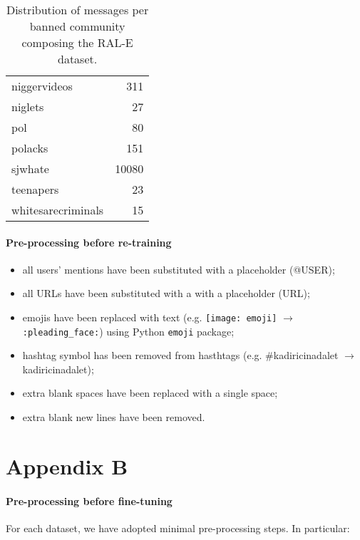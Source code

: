 \documentclass[11pt]{article}
\begin{document}
\begin{table}[!tbh]
\begin{tabular}{lr}
niggervideos        &        311 \\
niglets             &         27 \\
pol                 &         80 \\
polacks             &        151 \\
sjwhate             &      10080 \\
teenapers           &         23 \\
whitesarecriminals      &     15 \\
    \end{tabular}
    \caption{Distribution of messages per banned community composing the RAL-E dataset.}
    \label{tab:rale}
\end{table}


\paragraph{Pre-processing before re-training}

\begin{itemize}
    \item all users' mentions have been substituted with a placeholder (@USER);
    \item all URLs have been substituted with a with a placeholder (URL);
    \item emojis have been replaced with text (e.g. \texttt{[image: emoji]} $\rightarrow$ \texttt{:pleading\_face:}) using Python \texttt{emoji} package;
    \item hashtag symbol has been removed from hasthtags (e.g. \#kadiricinadalet $\rightarrow$ kadiricinadalet);
    \item extra blank spaces have been replaced with a single space;
    \item extra blank new lines have been removed.
\end{itemize}










\section*{Appendix B}

\paragraph{Pre-processing before fine-tuning} For each dataset, we have adopted minimal pre-processing steps. In particular:
\end{document}
